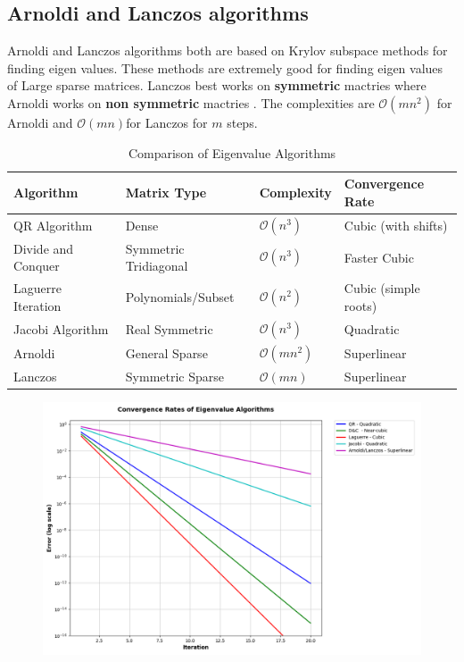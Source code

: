 \documentclass[pdflatex,sn-mathphys-num]{sn-jnl}
\begin{document}
\subsection{ Arnoldi and Lanczos algorithms}
Arnoldi and Lanczos algorithms both are based on  Krylov subspace methods for finding eigen values. These methods are extremely good for finding eigen values of Large sparse matrices. Lanczos best works on \textbf{symmetric} mactries where Arnoldi works on \textbf{non symmetric} mactries . The complexities are $\mathcal{O}(mn^2)$ for Arnoldi and  $\mathcal{O}(mn)$for Lanczos for $m$ steps.
\begin{table}[h!]
\centering
\begin{tabular}{|l|l|l|l|}
\hline
\textbf{Algorithm} & \textbf{Matrix Type} & \textbf{Complexity} & \textbf{Convergence Rate} \\ \hline
QR Algorithm & Dense & $\mathcal{O}(n^3)$ &  Cubic (with shifts) \\ \hline
Divide and Conquer & Symmetric Tridiagonal &  $\mathcal{O}(n^3)$  & Faster Cubic \\ \hline

Laguerre Iteration & Polynomials/Subset & $\mathcal{O}(n^2)$   & Cubic (simple roots) \\ \hline
Jacobi Algorithm & Real Symmetric & $\mathcal{O}(n^3)$ & Quadratic \\ \hline
Arnoldi & General Sparse & $\mathcal{O}(mn^2)$ & Superlinear  \\ \hline
Lanczos & Symmetric Sparse & $\mathcal{O}(mn)$ & Superlinear  \\ \hline
\end{tabular}
\caption{Comparison of Eigenvalue Algorithms}
\label{tab:eigen_algorithms}
\end{table}


\newpage

\begin{figure}[h]
\centering 
\includegraphics[width=15cm]{rate of convergence.png}
\end{figure}
\end{document}
